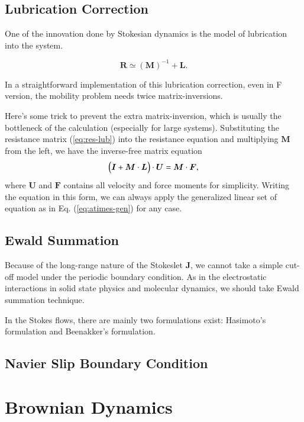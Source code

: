 \documentclass{book}
\begin{document}
\subsection{Lubrication Correction}
One of the innovation done by Stokesian dynamics
\cite{BradyBossis1988,DurlofskyEtal1987,BradyEtal1988}
is the model of lubrication into the system.

\begin{equation}
  \bm{R}
  \simeq
  \left(
    \bm{M}
  \right)^{-1}
  +
  \bm{L}
  .
  \label{eq:res-lub}
\end{equation}

In a straightforward implementation of this lubrication correction,
even in F version, the mobility problem needs twice matrix-inversions.

Here's some trick to prevent the extra matrix-inversion,
which is usually the bottleneck of the calculation
(especially for large systems).
Substituting the resistance matrix (\ref{eq:res-lub})
into the resistance equation and multiplying $\bm{M}$ from the left,
we have the inverse-free matrix equation
\begin{equation}
  \Bigl(
    \bm{I}
    +
    \bm{M}
    \cdot
    \bm{L}
  \Bigr)
  \cdot
  \bm{U}
  =
  \bm{M}
  \cdot
  \bm{F}
  ,
\end{equation}
where $\bm{U}$ and $\bm{F}$ contains all velocity and force moments
for simplicity.
Writing the equation in this form,
we can always apply the generalized linear set of equation
as in Eq. (\ref{eq:atimes-gen}) for any case.


\subsection{Ewald Summation}
Because of the long-range nature of the Stokeslet $\bm{J}$,
we cannot take a simple cut-off model under the periodic
boundary condition. As in the electrostatic interactions
in solid state physics and molecular dynamics, we should
take Ewald summation technique.

In the Stokes flows, there are mainly two formulations exist:
Hasimoto's formulation\cite{Hasimoto1959}
and Beenakker's formulation\cite{Beenakker1986}.


\subsection{Navier Slip Boundary Condition}


\section{Brownian Dynamics}
\label{sec:BrownianDynamics}
\end{document}
